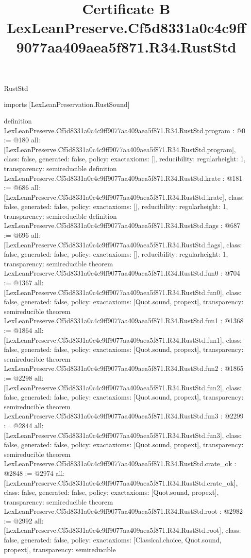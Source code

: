\begin{lexlean}{RustStd}
\title{Certificate B LexLeanPreserve.Cf5d8331a0c4c9ff9077aa409aea5f871.R34.RustStd}
\begin{coremodule}
imports [LexLeanPreservation.RustSound]

definition LexLeanPreserve.Cf5d8331a0c4c9ff9077aa409aea5f871.R34.RustStd.program : @0 := @180 {
  all: [LexLeanPreserve.Cf5d8331a0c4c9ff9077aa409aea5f871.R34.RustStd.program],
  class: false,
  generated: false,
  policy: exact{axioms: []},
  reducibility: regular{height: 1},
  transparency: semireducible
}
definition LexLeanPreserve.Cf5d8331a0c4c9ff9077aa409aea5f871.R34.RustStd.krate : @181 := @686 {
  all: [LexLeanPreserve.Cf5d8331a0c4c9ff9077aa409aea5f871.R34.RustStd.krate],
  class: false,
  generated: false,
  policy: exact{axioms: []},
  reducibility: regular{height: 1},
  transparency: semireducible
}
definition LexLeanPreserve.Cf5d8331a0c4c9ff9077aa409aea5f871.R34.RustStd.flags : @687 := @696 {
  all: [LexLeanPreserve.Cf5d8331a0c4c9ff9077aa409aea5f871.R34.RustStd.flags],
  class: false,
  generated: false,
  policy: exact{axioms: []},
  reducibility: regular{height: 1},
  transparency: semireducible
}
theorem LexLeanPreserve.Cf5d8331a0c4c9ff9077aa409aea5f871.R34.RustStd.fun0 : @704 := @1367 {
  all: [LexLeanPreserve.Cf5d8331a0c4c9ff9077aa409aea5f871.R34.RustStd.fun0],
  class: false,
  generated: false,
  policy: exact{axioms: [Quot.sound, propext]},
  transparency: semireducible
}
theorem LexLeanPreserve.Cf5d8331a0c4c9ff9077aa409aea5f871.R34.RustStd.fun1 : @1368 := @1864 {
  all: [LexLeanPreserve.Cf5d8331a0c4c9ff9077aa409aea5f871.R34.RustStd.fun1],
  class: false,
  generated: false,
  policy: exact{axioms: [Quot.sound, propext]},
  transparency: semireducible
}
theorem LexLeanPreserve.Cf5d8331a0c4c9ff9077aa409aea5f871.R34.RustStd.fun2 : @1865 := @2298 {
  all: [LexLeanPreserve.Cf5d8331a0c4c9ff9077aa409aea5f871.R34.RustStd.fun2],
  class: false,
  generated: false,
  policy: exact{axioms: [Quot.sound, propext]},
  transparency: semireducible
}
theorem LexLeanPreserve.Cf5d8331a0c4c9ff9077aa409aea5f871.R34.RustStd.fun3 : @2299 := @2844 {
  all: [LexLeanPreserve.Cf5d8331a0c4c9ff9077aa409aea5f871.R34.RustStd.fun3],
  class: false,
  generated: false,
  policy: exact{axioms: [Quot.sound, propext]},
  transparency: semireducible
}
theorem LexLeanPreserve.Cf5d8331a0c4c9ff9077aa409aea5f871.R34.RustStd.crate_ok : @2848 := @2974 {
  all: [LexLeanPreserve.Cf5d8331a0c4c9ff9077aa409aea5f871.R34.RustStd.crate_ok],
  class: false,
  generated: false,
  policy: exact{axioms: [Quot.sound, propext]},
  transparency: semireducible
}
theorem LexLeanPreserve.Cf5d8331a0c4c9ff9077aa409aea5f871.R34.RustStd.root : @2982 := @2992 {
  all: [LexLeanPreserve.Cf5d8331a0c4c9ff9077aa409aea5f871.R34.RustStd.root],
  class: false,
  generated: false,
  policy: exact{axioms: [Classical.choice, Quot.sound, propext]},
  transparency: semireducible
}


\end{coremodule}
\end{lexlean}
